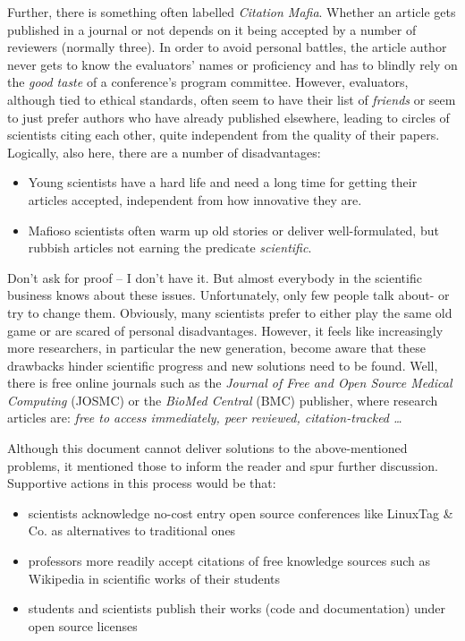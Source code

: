 Further, there is something often labelled \emph{Citation Mafia}. Whether an
article gets published in a journal or not depends on it being accepted by a
number of reviewers (normally three). In order to avoid personal battles, the
article author never gets to know the evaluators' names or proficiency and has
to blindly rely on the \emph{good taste} of a conference's program committee.
However, evaluators, although tied to ethical standards, often seem to have
their list of \emph{friends} or seem to just prefer authors who have already
published elsewhere, leading to circles of scientists citing each other, quite
independent from the quality of their papers. Logically, also here, there are a
number of disadvantages:

\begin{itemize}
    \item Young scientists have a hard life and need a long time for getting
        their articles accepted, independent from how innovative they are.
    \item Mafioso scientists often warm up old stories or deliver well-formulated,
        but rubbish articles not earning the predicate \emph{scientific}.
\end{itemize}

Don't ask for proof -- I don't have it. But almost everybody in the scientific
business knows about these issues. Unfortunately, only few people \cite{jobb}
talk about- or try to change them. Obviously, many scientists prefer to either
play the same old game or are scared of personal disadvantages. However, it
feels like increasingly more researchers, in particular the new generation,
become aware that these drawbacks hinder scientific progress and new solutions
need to be found. Well, there is free online journals such as the
\emph{Journal of Free and Open Source Medical Computing} (JOSMC) \cite{josmc}
or the \emph{BioMed Central} (BMC) \cite{bmc} publisher, where research
articles are: \textit{free to access immediately, peer reviewed,
citation-tracked \ldots}

Although this document cannot deliver solutions to the above-mentioned
problems, it mentioned those to inform the reader and spur further discussion.
Supportive actions in this process would be that:

\begin{itemize}
    \item scientists acknowledge no-cost entry open source conferences like
        LinuxTag \& Co. \cite{linuxtag} as alternatives to traditional ones
    \item professors more readily accept citations of free knowledge sources
        such as Wikipedia \cite{wikipedia} in scientific works of their students
    \item students and scientists publish their works (code and documentation)
        under open source licenses
\end{itemize}
